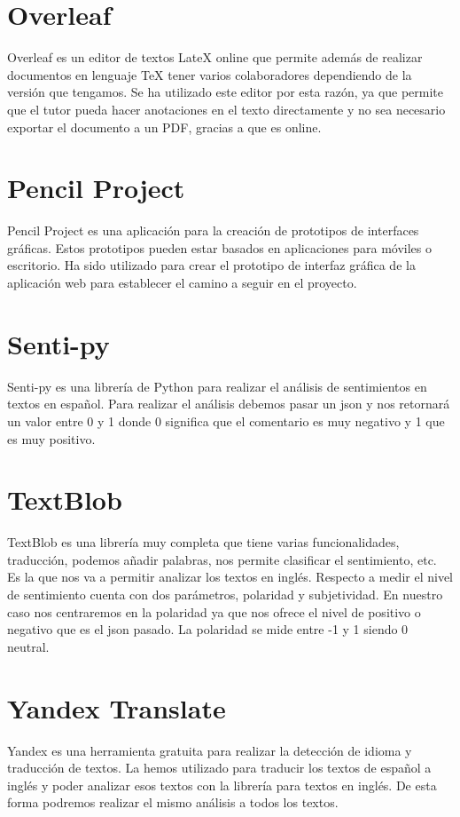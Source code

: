 \section{Overleaf}
Overleaf \cite{overleaf} es un editor de textos LateX online que permite además de realizar documentos en lenguaje TeX tener varios colaboradores dependiendo de la versión que tengamos.
Se ha utilizado este editor por esta razón, ya que permite que el tutor pueda hacer anotaciones en el texto directamente y no sea necesario exportar el documento a un PDF, gracias a que es online.

\section{Pencil Project}
Pencil Project \cite{pencil} es una aplicación para la creación de prototipos de interfaces gráficas.
Estos prototipos pueden estar basados en aplicaciones para móviles o escritorio.
Ha sido utilizado para crear el prototipo de interfaz gráfica de la aplicación web para establecer el camino a seguir en el proyecto.

\section{Senti-py}
Senti-py \cite{sentipy} es una librería de Python para realizar el análisis de sentimientos en textos en español. 
Para realizar el análisis debemos pasar un json y nos retornará un valor entre 0 y 1 donde 0 significa que el comentario es muy negativo y 1 que es muy positivo.

\section{TextBlob}
TextBlob \cite{textblob} es una librería muy completa que tiene varias funcionalidades, traducción, podemos añadir palabras, nos permite clasificar el sentimiento, etc. Es la que nos va a permitir analizar los textos en inglés.
Respecto a medir el nivel de sentimiento cuenta con dos parámetros, polaridad y subjetividad. En nuestro caso nos centraremos en la polaridad ya que nos ofrece el nivel de positivo o negativo que es el json pasado. La polaridad se mide entre -1 y 1 siendo 0 neutral.

\section{Yandex Translate}
Yandex \cite{yandex} es una herramienta gratuita para realizar la detección de idioma y traducción de textos. La hemos utilizado para traducir los textos de español a inglés y poder analizar esos textos con la librería para textos en inglés. De esta forma podremos realizar el mismo análisis a todos los textos.

